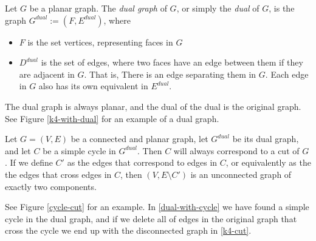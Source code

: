 \begin{definition}
    Let $G$ be a planar graph. The \emph{dual graph} of $G$, or simply the \emph{dual} of $G$, is the graph $G^{dual} := (F, E^{dual})$, where 
    \begin{itemize}
        \item $F$ is the set vertices, representing faces in $G$
        \item $D^{dual}$ is the set of edges, where two faces have an edge between them if they are adjacent in $G$. That is, There is an edge separating them in $G$. Each edge in $G$ also has its own equivalent in $E^{dual}$.
    \end{itemize}
    The dual graph is always planar, and the dual of the dual is the original graph. See Figure \ref{k4-with-dual} for an example of a dual graph.
\end{definition}

\begin{fact}
    Let $G = (V, E)$ be a connected and planar graph, let $G^{dual}$ be its dual graph, and let $C$ be a simple cycle in $G^{dual}$. Then $C$ will always correspond to a cut of $G$. If we define $C'$ as the edges that correspond to edges in $C$, or equivalently as the the edges that cross edges in $C$, then $(V,E \setminus C')$ is an unconnected graph of exactly two components.

    See Figure \ref{cycle-cut} for an example. In \ref{dual-with-cycle} we have found a simple cycle in the dual graph, and if we delete all of edges in the original graph that cross the cycle we end up with the disconnected graph in \ref{k4-cut}.
\end{fact}

